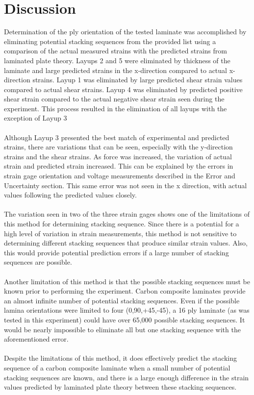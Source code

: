 \documentclass[12pt]{article}
\begin{document}
\section{Discussion}
Determination of the ply orientation of the tested laminate was accomplished by eliminating potential stacking sequences from the provided list using a comparison of the actual measured strains with the predicted strains from laminated plate theory. Layups 2 and 5 were eliminated by thickness of the laminate and large predicted strains in the x-direction compared to actual x-direction strains. Layup 1 was eliminated by large predicted shear strain values compared to actual shear strains. Layup 4 was eliminated by predicted positive shear strain compared to the actual negative shear strain seen during the experiment. This process resulted in the elimination of all layups with the exception of Layup 3
\\ \\ 
Although Layup 3 presented the best match of experimental and predicted strains, there are variations that can be seen, especially with the y-direction strains and the shear strains. As force was increased, the variation of actual strain and predicted strain increased. This can be explained by the errors in strain gage orientation and voltage measurements described in the Error and Uncertainty section. This same error was not seen in the x direction, with actual values following the predicted values closely.
\\ \\
The variation seen in two of the three strain gages shows one of the limitations of this method for determining stacking sequence. Since there is a potential for a high level of variation in strain measurements, this method is not sensitive to determining different stacking sequences that produce similar strain values. Also, this would provide potential prediction errors if a large number of stacking sequences are possible. 
\\ \\
Another limitation of this method is that the possible stacking sequences must be known prior to performing the experiment. Carbon composite laminates provide an almost infinite number of potential stacking sequences. Even if the possible lamina orientations were limited to four (0,90,+45,-45), a 16 ply laminate (as was tested in this experiment) could have over 65,000 possible stacking sequences. It would be nearly impossible to eliminate all but one stacking sequence with the aforementioned error.
\\ \\
Despite the limitations of this method, it does effectively predict the stacking sequence of a carbon composite laminate when a small number of potential stacking sequences are known, and there is a large enough difference in the strain values predicted by laminated plate theory between these stacking sequences.
 
\end{document}
